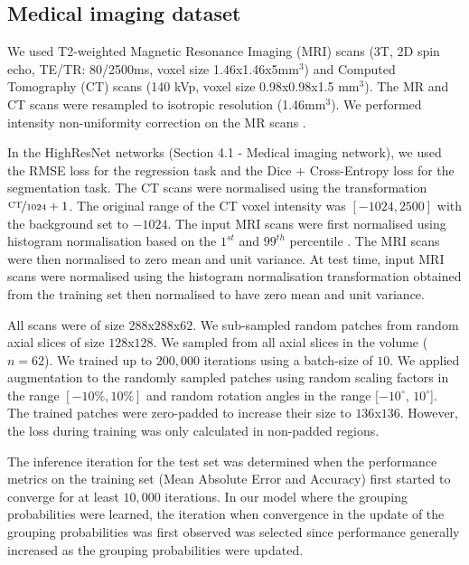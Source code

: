 \subsection{Medical imaging dataset}
We used T2-weighted Magnetic Resonance Imaging (MRI) scans (3T, 2D spin echo, TE/TR: 80/2500ms, voxel size 1.46x1.46x5mm$^{3}$) and Computed Tomography (CT) scans (140 kVp, voxel size 0.98x0.98x1.5 mm$^{3}$). The MR and CT scans were resampled to isotropic resolution (1.46mm$^{3}$). We performed intensity non-uniformity correction on the MR scans \cite{Tustison2010}.

In the HighResNet networks (Section 4.1 - Medical imaging network), we used the RMSE loss for the regression task and the Dice + Cross-Entropy loss \cite{dicex} for the segmentation task. The CT scans were normalised using the transformation $\nicefrac{\text{CT}}{1024} + 1$. The original range of the CT voxel intensity was $[-1024,2500]$ with the background set to $-1024$. The input MRI scans were first normalised using histogram normalisation based on the $1^{st}$ and $99^{th}$ percentile \cite{Nyul2000}. The MRI scans were then normalised to zero mean and unit variance. At test time, input MRI scans were normalised using the histogram normalisation transformation obtained from the training set then normalised to have zero mean and unit variance. 

All scans were of size $288$x$288$x$62$. We sub-sampled random patches from random axial slices of size $128$x$128$. We sampled from all axial slices in the volume ($n=62$). We trained up to $200,000$ iterations using a batch-size of $10$. We applied augmentation to the randomly sampled patches using random scaling factors in the range $[-10\%, 10\%]$ and random rotation angles in the range [$-10^\circ$, $10^\circ$]. The trained patches were zero-padded to increase their size to $136$x$136$. However, the loss during training was only calculated in non-padded regions.

The inference iteration for the test set was determined when the performance metrics on the training set (Mean Absolute Error and Accuracy) first started to converge for at least $10,000$ iterations. In our model where the grouping probabilities were learned, the iteration when convergence in the update of the grouping probabilities was first observed was selected since performance generally increased as the grouping probabilities were updated. 

